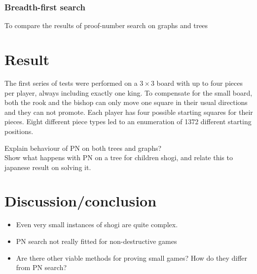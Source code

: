 \documentclass{article}
\begin{document}
\subsubsection*{Breadth-first search}
To compare the results of proof-number search on graphs and trees

\section{Result}
The first series of tests were performed on a $3 \times 3$ board with up to four pieces per player, always including exactly one king. To compensate
for the small board, both the rook and the bishop can only move one square in their usual directions and they can not promote. Each player
has four possible starting squares for their pieces. Eight different piece types led to an enumeration of 1372 different starting positions.

Explain behaviour of PN on both trees and graphs?\\

Show what happens with PN on a tree for children shogi, and relate this to japanese result on solving it.

\section{Discussion/conclusion}
\begin{itemize}
	\item Even very small instances of shogi are quite complex.
	\item PN search not really fitted for non-destructive games
	\item Are there other viable methods for proving small games? How do they differ from PN search?
\end{itemize}

{}

\end{document}
